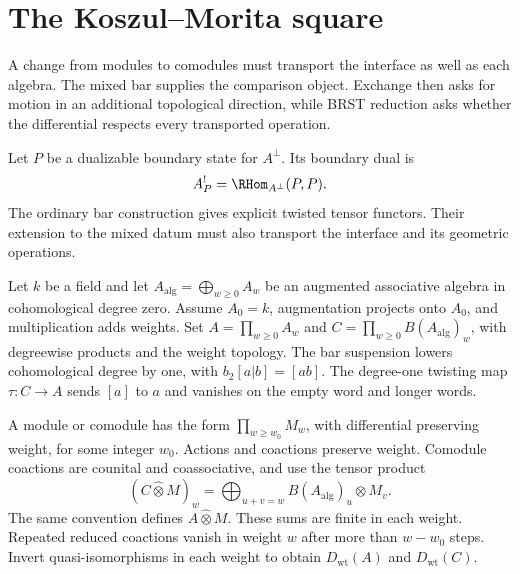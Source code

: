 \chapter{The Koszul--Morita square}
A change from modules to comodules must transport the interface as well as each algebra. The mixed bar supplies the comparison object. Exchange then asks for motion in an additional topological direction, while BRST reduction asks whether the differential respects every transported operation.

Let $P$ be a dualizable boundary state for $A^\perp$.  Its boundary dual is
\[
 A_P^!=\RHom_{A^\perp}(P,P).
\]
The ordinary bar construction gives explicit twisted tensor functors.
Their extension to the mixed datum must also transport the interface and
its geometric operations.

Let $k$ be a field and let $A_{\mathrm{alg}}=\bigoplus_{w\ge0}A_w$
be an augmented associative algebra in cohomological degree zero.
Assume $A_0=k$, augmentation projects onto $A_0$, and multiplication adds weights.
Set $A=\prod_{w\ge0}A_w$ and $C=\prod_{w\ge0}B(A_{\mathrm{alg}})_w$,
with degreewise products and the weight topology.
The bar suspension lowers cohomological degree by one, with $b_2[a|b]=[ab]$.
The degree-one twisting map $\tau:C\to A$ sends $[a]$ to $a$
and vanishes on the empty word and longer words.

A module or comodule has the form $\prod_{w\ge w_0}M_w$,
with differential preserving weight, for some integer $w_0$.
Actions and coactions preserve weight.
Comodule coactions are counital and coassociative, and use the tensor product
\[
 (C\widehat\otimes M)_w
 =\bigoplus_{u+v=w}B(A_{\mathrm{alg}})_u\otimes M_v.
\]
The same convention defines $A\widehat\otimes M$.
These sums are finite in each weight.
Repeated reduced coactions vanish in weight $w$ after more than $w-w_0$ steps.
Invert quasi-isomorphisms in each weight to obtain $D_{\mathrm{wt}}(A)$
and $D_{\mathrm{wt}}(C)$.

